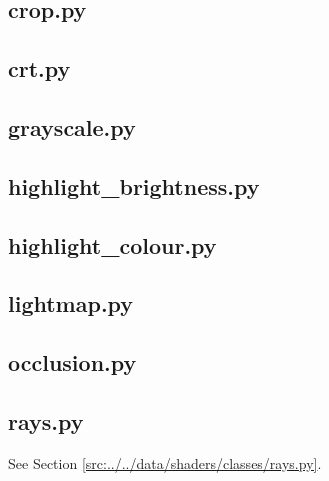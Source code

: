 \documentclass[../main/main.tex]{subfiles}
\begin{document}
\subsection{crop.py}

\label{src:data/shaders/classes/crop.py}

\subsection{crt.py}

\label{src:data/shaders/classes/crt.py}

\subsection{grayscale.py}

\label{src:data/shaders/classes/grayscale.py}

\subsection{highlight\_brightness.py}

\label{src:data/shaders/classes/highlight_brightness.py}

\subsection{highlight\_colour.py}

\label{src:data/shaders/classes/highlight_colour.py}

\subsection{lightmap.py}

\label{src:data/shaders/classes/lightmap.py}

\subsection{occlusion.py}

\label{src:data/shaders/classes/occlusion.py}

\subsection{rays.py}
See Section \ref{src:../../data/shaders/classes/rays.py}.
\end{document}
